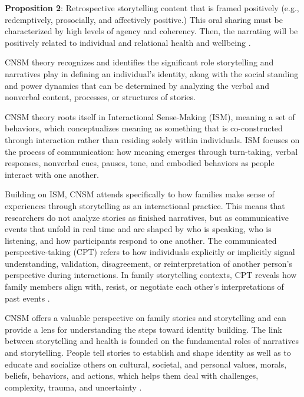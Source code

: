 \textbf{Proposition 2}: Retrospective storytelling content that is framed positively (e.g., redemptively, prosocially, and affectively positive.) This oral sharing must be characterized by high levels of agency and coherency. Then, the narrating will be positively related to individual and relational health and wellbeing \citep[p.~120]{koenigkellasCommunicatedNarrativeSenseMaking2022}.

CNSM theory recognizes and identifies the significant role storytelling and narratives play in defining an individual’s identity, along with the social standing and power dynamics that can be determined by analyzing the verbal and nonverbal content, processes, or structures of stories.

CNSM theory roots itself in Interactional Sense-Making (ISM), meaning a set of behaviors, which conceptualizes meaning as something that is co-constructed through interaction rather than residing solely within individuals. ISM focuses on the process of communication: how meaning emerges through turn-taking, verbal responses, nonverbal cues, pauses, tone, and embodied behaviors as people interact with one another.

Building on ISM, CNSM attends specifically to how families make sense of experiences through storytelling as an interactional practice. This means that researchers do not analyze stories as finished narratives, but as communicative events that unfold in real time and are shaped by who is speaking, who is listening, and how participants respond to one another. The communicated perspective-taking (CPT) refers to how individuals explicitly or implicitly signal understanding, validation, disagreement, or reinterpretation of another person’s perspective during interactions. In family storytelling contexts, CPT reveals how family members align with, resist, or negotiate each other’s interpretations of past events \citep{koenigkellasCommunicatedNarrativeSenseMaking2022}.

CNSM offers a valuable perspective on family stories and storytelling and can provide a lens for understanding the steps toward identity building. The link between storytelling and health is founded on the fundamental roles of narratives and storytelling. People tell stories to establish and shape identity as well as to  educate and socialize others on cultural, societal, and personal values, morals, beliefs, behaviors, and actions, which helps them deal with challenges, complexity,  trauma, and uncertainty \citep{koenigkellasCommunicatedNarrativeSenseMaking2022, koenigkellasCommunicatedNarrativeSenseMaking2018, koenigkellasFamilyStoriesStorytelling2012}.

